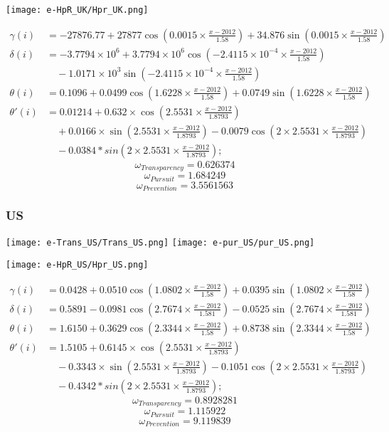 \documentclass[12pt]{article}
\begin{document}
		\texttt{[image: e-HpR\_UK/Hpr\_UK.png]}
		
\begin{align*}
	\gamma(i)&=-27876.77 + 27877\cos(0.0015\times\frac{x - 2012}{1.58})+34.876\sin(0.0015\times\frac{x - 2012}{1.58})\\
	\delta(i)&=-3.7794\times 10^{6}+3.7794\times 10^{6}\cos(-2.4115\times 10^{-4}\times\frac{x - 2012}{1.58})\\
	&\quad - 1.0171\times 10^{3}\sin(-2.4115\times 10^{-4}\times\frac{x - 2012}{1.58})\\	
	\theta(i)&=0.1096+0.0499\cos(1.6228\times\frac{x - 2012}{1.58})+  0.0749\sin(1.6228\times\frac{x - 2012}{1.58})\\
	\theta'(i) &= 0.01214 + 0.632\times\cos(2.5531\times\frac{x - 2012}{1.8793})\\
	&\quad +0.0166\times\sin(2.5531\times\frac{x - 2012}{1.8793})-0.0079\cos(2\times 2.5531\times\frac{x - 2012}{1.8793})\\
	&\quad-0.0384*sin(2\times 2.5531\times\frac{x - 2012}{1.8793});
\end{align*}
	\[\omega_{Transparency} = 0.626374\]
	\[\omega_{Pursuit}=1.684249\]
	\[\omega_{Prevention}= 3.5561563\]

	
	\subsubsection{US}
		\begin{center}
	\texttt{[image: e-Trans\_US/Trans\_US.png]}
	\texttt{[image: e-pur\_US/pur\_US.png]}
\end{center}


	\texttt{[image: e-HpR\_US/Hpr\_US.png]}
	
	\begin{align*}
		\gamma(i)&=0.0428 + 0.0510\cos(1.0802\times\frac{x - 2012}{1.58})+0.0395\sin(1.0802\times\frac{x - 2012}{1.58})\\
		\delta(i)&=0.5891-0.0981\cos(2.7674\times\frac{x - 2012}{1.581}) - 0.0525\sin(2.7674\times\frac{x - 2012}{1.581})\\	
		\theta(i)&=1.6150+0.3629\cos(2.3344\times\frac{x - 2012}{1.58})+  0.8738\sin(2.3344\times\frac{x - 2012}{1.58})\\
		\theta'(i) &= 1.5105 + 0.6145\times\cos(2.5531\times\frac{x - 2012}{1.8793})\\
		&\quad -0.3343\times\sin(2.5531\times\frac{x - 2012}{1.8793})-0.1051\cos(2\times 2.5531\times\frac{x - 2012}{1.8793})\\
		&\quad-0.4342*sin(2\times 2.5531\times\frac{x - 2012}{1.8793});
	\end{align*}
	\[\omega_{Transparency} = 0.8928281\]
	\[\omega_{Pursuit}=1.115922\]
	\[\omega_{Prevention}= 9.119839\]
	
\end{document}
